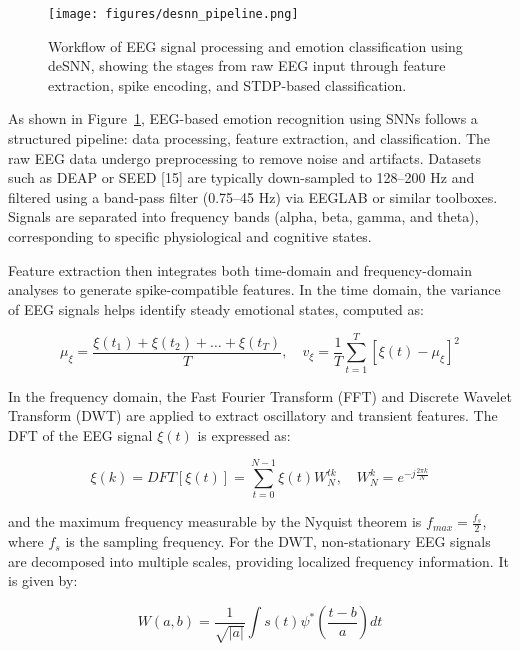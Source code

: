 \documentclass[conference]{IEEEtran}
\begin{document}
\begin{figure}[H]
    \centering
    \texttt{[image: figures/desnn\_pipeline.png]}
    \caption{Workflow of EEG signal processing and emotion classification using deSNN, showing the stages from raw EEG input through feature extraction, spike encoding, and STDP-based classification.}
    \label{fig:desnn_pipeline}
\end{figure}

As shown in Figure~\ref{fig:desnn_pipeline}, EEG-based emotion recognition using SNNs follows a structured pipeline: data processing, feature extraction, and classification. The raw EEG data undergo preprocessing to remove noise and artifacts. Datasets such as DEAP or SEED [15] are typically down-sampled to 128–200 Hz and filtered using a band-pass filter (0.75–45 Hz) via EEGLAB or similar toolboxes. Signals are separated into frequency bands (alpha, beta, gamma, and theta), corresponding to specific physiological and cognitive states.

Feature extraction then integrates both time-domain and frequency-domain analyses to generate spike-compatible features. In the time domain, the variance of EEG signals helps identify steady emotional states, computed as:

\begin{equation}
\mu_{\xi} = \frac{\xi(t_1) + \xi(t_2) + \dots + \xi(t_T)}{T}, \quad
v_{\xi} = \frac{1}{T} \sum_{t=1}^{T} [\xi(t) - \mu_{\xi}]^2
\end{equation}

In the frequency domain, the Fast Fourier Transform (FFT) and Discrete Wavelet Transform (DWT) \cite{Luo2020SNN_EEGEmotion} are applied to extract oscillatory and transient features. The DFT of the EEG signal \( \xi(t) \) is expressed as:

\begin{equation}
\xi(k) = DFT[\xi(t)] = \sum_{t=0}^{N-1} \xi(t) W_N^{tk}, \quad W_N^k = e^{-j \frac{2\pi k}{N}}
\end{equation}

and the maximum frequency measurable by the Nyquist theorem is \( f_{max} = \frac{f_s}{2} \), where \( f_s \) is the sampling frequency.  
For the DWT, non-stationary EEG signals are decomposed into multiple scales, providing localized frequency information. It is given by:

\begin{equation}
W(a,b) = \frac{1}{\sqrt{|a|}} \int s(t) \psi^* \left( \frac{t - b}{a} \right) dt
\end{equation}
\end{document}
